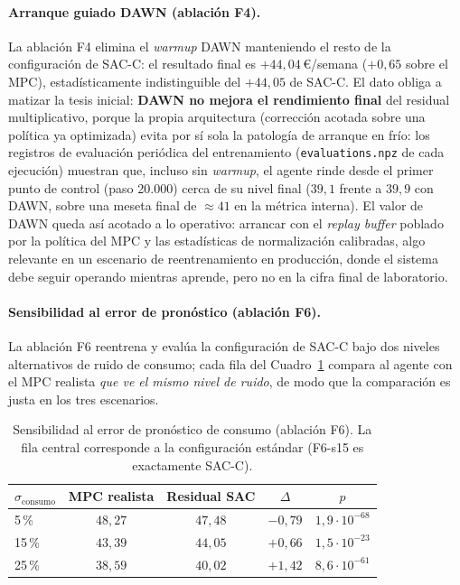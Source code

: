 \documentclass[12pt, a4paper, twoside]{report}
\begin{document}
\paragraph{Arranque guiado DAWN (ablación F4).} La ablación F4 elimina el
\textit{warmup} DAWN manteniendo el resto de la configuración de SAC-C: el
resultado final es $+44{,}04$\,€/semana ($+0{,}65$ sobre el MPC),
estadísticamente indistinguible del $+44{,}05$ de SAC-C. El dato obliga a
matizar la tesis inicial: \textbf{DAWN no mejora el rendimiento final} del
residual multiplicativo, porque la propia arquitectura (corrección acotada
sobre una política ya optimizada) evita por sí sola la patología de arranque
en frío: los registros de evaluación periódica del entrenamiento
(\texttt{evaluations.npz} de cada ejecución) muestran que, incluso sin
\textit{warmup}, el agente rinde desde el primer punto de control (paso
20.000) cerca de su nivel final ($39{,}1$ frente a $39{,}9$ con DAWN, sobre
una meseta final de $\approx41$ en la métrica interna). El valor de DAWN queda así acotado a lo
operativo: arrancar con el \textit{replay buffer} poblado por la política del
MPC y las estadísticas de normalización calibradas, algo relevante en un
escenario de reentrenamiento en producción, donde el sistema debe seguir
operando mientras aprende, pero no en la cifra final de laboratorio.

\paragraph{Sensibilidad al error de pronóstico (ablación F6).} La ablación F6
reentrena y evalúa la configuración de SAC-C bajo dos niveles alternativos de
ruido de consumo; cada fila del Cuadro~\ref{tab:f6} compara al agente con el
MPC realista \emph{que ve el mismo nivel de ruido}, de modo que la comparación
es justa en los tres escenarios.

\begin{table}[H]
\centering
\caption{Sensibilidad al error de pronóstico de consumo (ablación F6). La
fila central corresponde a la configuración estándar (F6-s15 es exactamente
SAC-C).}
\label{tab:f6}
\begin{tabular}{lcccc}
\toprule
$\sigma_{\text{consumo}}$ & \textbf{MPC realista} & \textbf{Residual SAC} &
\textbf{$\Delta$} & \textbf{$p$} \\
\midrule
5\,\%  & $48{,}27$ & $47{,}48$ & $-0{,}79$ & $1{,}9\cdot10^{-68}$ \\
15\,\% & $43{,}39$ & $44{,}05$ & $+0{,}66$ & $1{,}5\cdot10^{-23}$ \\
25\,\% & $38{,}59$ & $40{,}02$ & $+1{,}42$ & $8{,}6\cdot10^{-61}$ \\
\bottomrule
\end{tabular}
\end{table}
\end{document}
